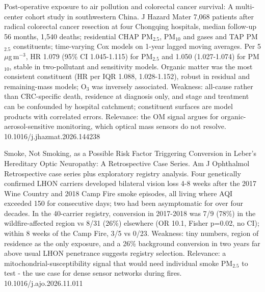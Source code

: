 \documentclass[10pt]{article}
\begin{document}
\par{}\baselineskip{}\baselineskip
{}

{Post-operative exposure to air pollution and colorectal cancer survival: A multi-center cohort study in southwestern China.}
{J Hazard Mater}
{7,068 patients after radical colorectal cancer resection at four Chongqing hospitals, median follow-up 56 months, 1,540 deaths; residential CHAP PM$_{2.5}$, PM$_{10}$ and gases and TAP PM$_{2.5}$ constituents; time-varying Cox models on 1-year lagged moving averages. Per 5 $\mu$g\,m$^{-3}$, HR 1.079 (95\% CI 1.045-1.115) for PM$_{2.5}$ and 1.050 (1.027-1.074) for PM$_{10}$, stable in two-pollutant and sensitivity models. Organic matter was the most consistent constituent (HR per IQR 1.088, 1.028-1.152), robust in residual and remaining-mass models; O$_3$ was inversely associated. Weakness: all-cause rather than CRC-specific death, residence at diagnosis only, and stage and treatment can be confounded by hospital catchment; constituent surfaces are model products with correlated errors. Relevance: the OM signal argues for organic-aerosol-sensitive monitoring, which optical mass sensors do not resolve.}
{10.1016/j.jhazmat.2026.144238}

{Smoke, Not Smoking, as a Possible Risk Factor Triggering Conversion in Leber's Hereditary Optic Neuropathy: A Retrospective Case Series.}
{Am J Ophthalmol}
{Retrospective case series plus exploratory registry analysis. Four genetically confirmed LHON carriers developed bilateral vision loss 4-8 weeks after the 2017 Wine Country and 2018 Camp Fire smoke episodes, all living where AQI exceeded 150 for consecutive days; two had been asymptomatic for over four decades. In the 40-carrier registry, conversion in 2017-2018 was 7/9 (78\%) in the wildfire-affected region vs 8/31 (26\%) elsewhere (OR 10.1, Fisher p=0.02, no CI); within 8 weeks of the Camp Fire, 3/5 vs 0/23. Weakness: tiny numbers, region of residence as the only exposure, and a 26\% background conversion in two years far above usual LHON penetrance suggests registry selection. Relevance: a mitochondrial-susceptibility signal that would need individual smoke PM$_{2.5}$ to test - the use case for dense sensor networks during fires.}
{10.1016/j.ajo.2026.11.011}
\end{document}
